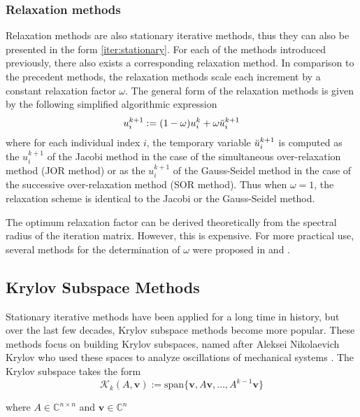 \subsubsection{Relaxation methods}
Relaxation methods are also stationary iterative methods, thus they can also be presented in the form \autoref{iter:stationary}. For each of the methods introduced previously, there also exists a corresponding relaxation method.
In comparison to the precedent methods, the relaxation methods scale each increment by a constant relaxation factor $\omega$. The general form of the relaxation methods is given by the following simplified algorithmic expression
\begin{align}
    u_{i}^{k+1} := (1-\omega)u_i^k + \omega \Breve{u}_i^{k+1}
\end{align}
where for each individual index $i$, the temporary variable $\Breve{u}_i^{k+1}$ is computed as the $u_i^{k+1}$ of the Jacobi method in the case of the simultaneous over-relaxation method (JOR method) or as the $u_i^{k+1}$ of the Gauss-Seidel method in the case of the successive over-relaxation method (SOR method). Thus when $\omega = 1$, the relaxation scheme is identical to the Jacobi or the Gauss-Seidel method.

The optimum relaxation factor can be derived theoretically from the spectral radius of the iteration matrix. However, this is expensive. For more practical use, several methods for the determination of $\omega$ were proposed in \citep{https://doi.org/10.1002/zamm.19940740205} and \citep{young2014iterative}.


\subsection{Krylov Subspace Methods}
\label{section:krylov_subspace}
Stationary iterative methods have been applied for a long time in history, but over the last few decades, Krylov subspace methods become more popular. These methods focus on building Krylov subspaces, named after Aleksei Nikolaevich Krylov who used these spaces to analyze oscillations of mechanical systems \citep{krylov1931numerical}. The Krylov subspace takes the form
\begin{equation}
    \mathcal{K}_k(A,\boldsymbol{v}) := \text{span}\{\boldsymbol{v},A\boldsymbol{v},\dots,A^{k-1}\boldsymbol{v}\}
\end{equation}

where $A \in \mathbb{C}^{n\times n}$ and $\boldsymbol{v} \in \mathbb{C}^n$


